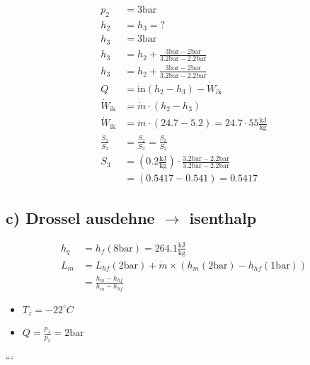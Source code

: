\begin{align*}
    p_2 &= 3 \text{bar} \\
    h_2 &= h_3 = ? \\
    h_3 &= 3 \text{bar} \\
    h_3 &= h_2 + \frac{3 \text{bar} - 2 \text{bar}}{3.2 \text{bar} - 2.2 \text{bar}} \\
    h_3 &= h_2 + \frac{3 \text{bar} - 2 \text{bar}}{3.2 \text{bar} - 2.2 \text{bar}} \\
    Q &= \text{in} \left( h_2 - h_3 \right) - \dot{W}_{\text{ik}} \\
    \dot{W}_{\text{ik}} &= \dot{m} \cdot \left( h_2 - h_3 \right) \\
    \dot{W}_{\text{ik}} &= \dot{m} \cdot \left( 24.7 - 5.2 \right) = 24.7 \cdot 55 \frac{\text{kJ}}{\text{kg}} \\
    \frac{S_2}{S_3} &= \frac{S_2}{S_3} = \frac{S_3}{S_2} \\
    S_3 &= \left( 0.2 \frac{\text{kJ}}{\text{kg}} \right) \cdot \frac{3.2 \text{bar} - 2.2 \text{bar}}{3.2 \text{bar} - 2.2 \text{bar}} \\
    &= \left( 0.5417 - 0.541 \right) = 0.5417
\end{align*}

\subsection*{c) Drossel ausdehne $\rightarrow$ isenthalp}

\begin{align*}
    h_q &= h_f \left( 8 \text{bar} \right) = 264.1 \frac{\text{kJ}}{\text{kg}} \\
    L_m &= L_{hf} \left( 2 \text{bar} \right) + \dot{m} \times \left( h_{m} \left( 2 \text{bar} \right) - h_{hf} \left( 1 \text{bar} \right) \right) \\
    &= \frac{h_{m} - h_{hf}}{h_{m} - h_{hf}}
\end{align*}

\begin{itemize}
    \item $T_z = -22^\circ C$
    \item $Q = \frac{p_1}{p_2} = 2 \text{bar}$
\end{itemize}

```